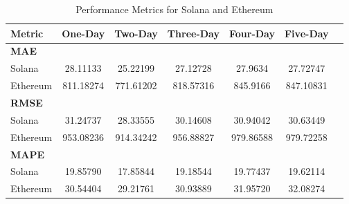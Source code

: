 \begin{table}[H]
\centering
\begin{tabular}{lcccccc}
\toprule
\textbf{Metric} & \textbf{One-Day} & \textbf{Two-Day} & \textbf{Three-Day} & \textbf{Four-Day} & \textbf{Five-Day} \\
\midrule
\textbf{MAE} & & & & & \\
Solana        & 28.11133 & 25.22199 & 27.12728 & 27.9634 & 27.72747 \\
Ethereum      & 811.18274 & 771.61202 & 818.57316 & 845.9166 & 847.10831 \\
\midrule
\textbf{RMSE} & & & & & \\
Solana        & 31.24737 & 28.33555 & 30.14608 & 30.94042 & 30.63449 \\
Ethereum      & 953.08236 & 914.34242 & 956.88827 & 979.86588 & 979.72258 \\
\midrule
\textbf{MAPE} & & & & & \\
Solana        & 19.85790 & 17.85844 & 19.18544 & 19.77437 & 19.62114 \\
Ethereum      & 30.54404 & 29.21761 & 30.93889 & 31.95720 & 32.08274 \\
\bottomrule
\end{tabular}
\caption{Performance Metrics for Solana and Ethereum}
\label{table:SOL_ETH_MAE_RMSE_MAPE}
\end{table}

